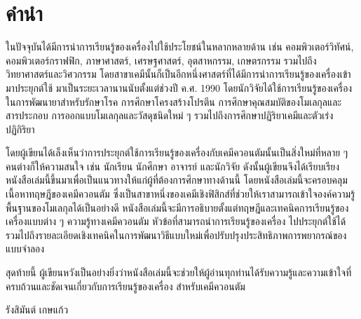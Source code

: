 

\chapter*{\centering คำนำ}

ในปัจจุบันได้มีการนำการเรียนรู้ของเครื่องไปใช้ประโยชน์ในหลากหลายด้าน เช่น คอมพิวเตอร์วิทัศน์, คอมพิวเตอร์กราฟฟิก, ภาษาศาสตร์, เศรษฐศาสตร์, 
อุตสาหกรรม, เกษตรกรรม รวมไปถึงวิทยาศาสตร์และวิศวกรรม โดยสาขาเคมีนั้นก็เป็นอีกหนึ่งศาสตร์ที่ได้มีการนำการเรียนรู้ของเครื่องเข้ามาประยุกต์ใช้%
มาเป็นระยะเวลานานนับตั้งแต่ช่วงปี ค.ศ. 1990 โดยนักวิจัยได้ใช้การเรียนรู้ของเครื่องในการพัฒนายาสำหรับรักษาโรค การศึกษาโครงสร้างโปรตีน 
การศึกษาคุณสมบัติของโมเลกุลและสารประกอบ การออกแบบโมเลกุลและวัสดุชนิดใหม่ ๆ รวมไปถึงการศึกษาปฏิริยาเคมีและตัวเร่งปฏิกิริยา

โดยผู้เขียนได้เล็งเห็นว่าการประยุกต์ใช้การเรียนรู้ของเครื่องกับเคมีควอนตัมนั้นเป็นสิ่งใหม่ที่หลาย ๆ คนต่างก็ให้ความสนใจ เช่น นักเรียน นักศึกษา 
อาจารย์ และนักวิจัย ดังนั้นผู้เขียนจึงได้เรียบเรียงหนังสือเล่มนี้ขึ้นมาเพื่อเป็นแนวทางให้แก่ผู้ที่ต้องการศึกษาทางด้านนี้ โดยหนังสือเล่มนี้จะครอบคลุม%
เนื้อหาทฤษฎีของเคมีควอนตัม ซึ่งเป็นสาขาหนึ่งของเคมีเชิงฟิสิกส์ที่ช่วยให้เราสามารถเข้าใจองค์ความรู้พื้นฐานของโมเลกุลได้เป็นอย่างดี 
หนังสือเล่มนี้จะมีการอธิบายตั้งแต่ทฤษฎีและเทคนิคการเรียนรู้ของเครื่องแบบต่าง ๆ ความรู้ทางเคมีควอนตัม หัวข้อที่สามารถนำการเรียนรู้ของเครื่อง%
ไปประยุกต์ใช้ได้ รวมไปถึงรายละเอียดเชิงเทคนิคในการพัฒนาวิธีแบบใหม่เพื่อปรับปรุงประสิทธิภาพการพยากรณ์ของแบบจำลอง

สุดท้ายนี้ ผู้เขียนหวังเป็นอย่างยิ่งว่าหนังสือเล่มนี้จะช่วยให้ผู้อ่านทุกท่านได้รับความรู้และความเข้าใจที่ครบถ้วนและชัดเจนเกี่ยวกับการเรียนรู้ของเครื่อง%
สำหรับเคมีควอนตัม

\medskip

\begin{flushright}
รังสิมันต์ เกษแก้ว
\end{flushright}
